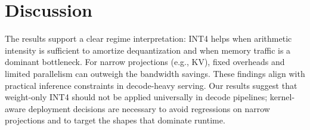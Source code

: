 \section{Discussion}
The results support a clear regime interpretation: INT4 helps when arithmetic
intensity is sufficient to amortize dequantization and when memory traffic is a
dominant bottleneck. For narrow projections (e.g., KV), fixed overheads and
limited parallelism can outweigh the bandwidth savings. These findings align
with practical inference constraints in decode-heavy serving. Our results
suggest that weight-only INT4 should not be applied universally in decode
pipelines; kernel-aware deployment decisions are necessary to avoid regressions
on narrow projections and to target the shapes that dominate runtime.
